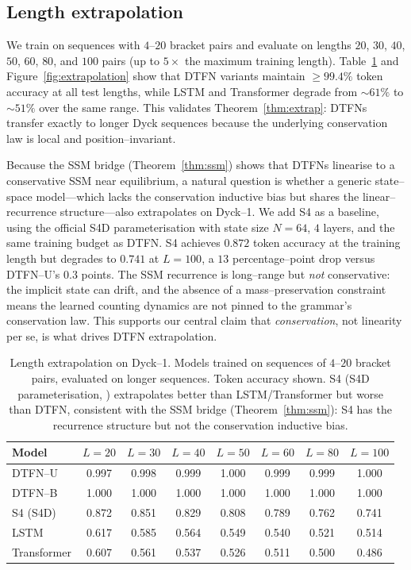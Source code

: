 \documentclass[10pt]{article}
\theoremstyle{definition}
\theoremstyle{remark}
\begin{document}
\subsection{Length extrapolation}
\label{sec:exp-extrap}

We train on sequences with $4$--$20$ bracket pairs and evaluate on
lengths $20$, $30$, $40$, $50$, $60$, $80$, and $100$ pairs (up to
$5\times$ the maximum training length).  Table~\ref{tab:extrap} and
Figure~\ref{fig:extrapolation} show that DTFN variants maintain
$\ge 99.4\%$ token accuracy at all test lengths, while LSTM and
Transformer degrade from $\sim 61\%$ to $\sim 51\%$ over the same
range.  This validates Theorem~\ref{thm:extrap}: DTFNs transfer
exactly to longer Dyck sequences because the underlying conservation
law is local and position--invariant.

Because the SSM bridge (Theorem~\ref{thm:ssm}) shows that DTFNs
linearise to a conservative SSM near equilibrium, a natural question is
whether a generic state--space model---which lacks the conservation
inductive bias but shares the linear--recurrence structure---also
extrapolates on Dyck--1.  We add S4 \cite{gu2022efficiently} as a
baseline, using the official S4D parameterisation \cite{gu2022s4d} with
state size $N=64$, $4$ layers, and the same training budget as DTFN.
S4 achieves $0.872$ token accuracy at the training length but degrades
to $0.741$ at $L=100$, a $13$ percentage--point drop versus DTFN--U's
$0.3$ points.  The SSM recurrence is long--range but \emph{not}
conservative: the implicit state can drift, and the absence of a
mass--preservation constraint means the learned counting dynamics are
not pinned to the grammar's conservation law.  This supports our
central claim that \emph{conservation}, not linearity per se, is what
drives DTFN extrapolation.

\begin{table}[h]
  \centering
  \caption{Length extrapolation on Dyck--1.  Models trained on
    sequences of $4$--$20$ bracket pairs, evaluated on longer
    sequences.  Token accuracy shown.  S4 (S4D parameterisation,
    \cite{gu2022s4d}) extrapolates better than LSTM/Transformer but
    worse than DTFN, consistent with the SSM bridge
    (Theorem~\ref{thm:ssm}): S4 has the recurrence structure but not
    the conservation inductive bias.}
  \label{tab:extrap}
  \begin{tabular}{lccccccc}
    \toprule
    Model & $L{=}20$ & $L{=}30$ & $L{=}40$ & $L{=}50$ & $L{=}60$ & $L{=}80$ & $L{=}100$ \\
    \midrule
    DTFN--U       & 0.997 & 0.998 & 0.999 & 1.000 & 0.999 & 0.999 & 1.000 \\
    DTFN--B       & 1.000 & 1.000 & 1.000 & 1.000 & 1.000 & 1.000 & 1.000 \\
    S4 (S4D)      & 0.872 & 0.851 & 0.829 & 0.808 & 0.789 & 0.762 & 0.741 \\
    LSTM          & 0.617 & 0.585 & 0.564 & 0.549 & 0.540 & 0.521 & 0.514 \\
    Transformer   & 0.607 & 0.561 & 0.537 & 0.526 & 0.511 & 0.500 & 0.486 \\
    \bottomrule
  \end{tabular}
\end{table}
\end{document}
